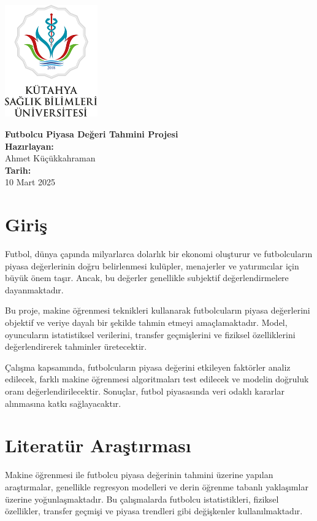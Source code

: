 \documentclass{article}
\begin{document}
\begin{center}
		\vspace*{2cm}
		\includegraphics[width=4cm]{Kütahya_Sağlık_Bilimleri_Üniversitesi_logo.png} 
		\vspace{1cm}
			
		{\Huge \textbf{Futbolcu Piyasa Değeri Tahmini Projesi}}\\[2cm]
		
		\textbf{Hazırlayan:}\\
		Ahmet Küçükkahraman\\[1cm]
		\textbf{Tarih:} \\ 10 Mart 2025\\[3cm]
	
    \end{center}








\section{Giriş}
Futbol, dünya çapında milyarlarca dolarlık bir ekonomi oluşturur ve futbolcuların piyasa değerlerinin doğru belirlenmesi kulüpler, menajerler ve yatırımcılar için büyük önem taşır. Ancak, bu değerler genellikle subjektif değerlendirmelere dayanmaktadır.

Bu proje, makine öğrenmesi teknikleri kullanarak futbolcuların piyasa değerlerini objektif ve veriye dayalı bir şekilde tahmin etmeyi amaçlamaktadır. Model, oyuncuların istatistiksel verilerini, transfer geçmişlerini ve fiziksel özelliklerini değerlendirerek tahminler üretecektir.

Çalışma kapsamında, futbolcuların piyasa değerini etkileyen faktörler analiz edilecek, farklı makine öğrenmesi algoritmaları test edilecek ve modelin doğruluk oranı değerlendirilecektir. Sonuçlar, futbol piyasasında veri odaklı kararlar alınmasına katkı sağlayacaktır.
\newpage
\section{Literatür Araştırması}
Makine öğrenmesi ile futbolcu piyasa değerinin tahmini üzerine yapılan araştırmalar, genellikle regresyon modelleri ve derin öğrenme tabanlı yaklaşımlar üzerine yoğunlaşmaktadır. Bu çalışmalarda futbolcu istatistikleri, fiziksel özellikler, transfer geçmişi ve piyasa trendleri gibi değişkenler kullanılmaktadır.
\end{document}
